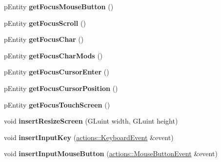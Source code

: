 \begin{DoxyCompactItemize}
\item 
\hypertarget{classfillwave_1_1Engine_aefde4bc713b408d61506022aeade536b}{}p\+Entity {\bfseries get\+Focus\+Mouse\+Button} ()\label{classfillwave_1_1Engine_aefde4bc713b408d61506022aeade536b}

\item 
\hypertarget{classfillwave_1_1Engine_a6f0ba798e60d2d07143ee193097d3a2a}{}p\+Entity {\bfseries get\+Focus\+Scroll} ()\label{classfillwave_1_1Engine_a6f0ba798e60d2d07143ee193097d3a2a}

\item 
\hypertarget{classfillwave_1_1Engine_a197ec75cd04d2f5f439151d050dcabfb}{}p\+Entity {\bfseries get\+Focus\+Char} ()\label{classfillwave_1_1Engine_a197ec75cd04d2f5f439151d050dcabfb}

\item 
\hypertarget{classfillwave_1_1Engine_ad3dc35ddb09c7244edca4b68a09a417e}{}p\+Entity {\bfseries get\+Focus\+Char\+Mods} ()\label{classfillwave_1_1Engine_ad3dc35ddb09c7244edca4b68a09a417e}

\item 
\hypertarget{classfillwave_1_1Engine_a3695c0daae1ac6728b59f3fd9ea8717b}{}p\+Entity {\bfseries get\+Focus\+Cursor\+Enter} ()\label{classfillwave_1_1Engine_a3695c0daae1ac6728b59f3fd9ea8717b}

\item 
\hypertarget{classfillwave_1_1Engine_a7e03137a6810f968be5884cf8af99090}{}p\+Entity {\bfseries get\+Focus\+Cursor\+Position} ()\label{classfillwave_1_1Engine_a7e03137a6810f968be5884cf8af99090}

\item 
\hypertarget{classfillwave_1_1Engine_aaffd805632dff9153fa76391987e902d}{}p\+Entity {\bfseries get\+Focus\+Touch\+Screen} ()\label{classfillwave_1_1Engine_aaffd805632dff9153fa76391987e902d}

\item 
\hypertarget{classfillwave_1_1Engine_ab5a508e59472b0653897b4c69ec09a63}{}void {\bfseries insert\+Resize\+Screen} (G\+Luint width, G\+Luint height)\label{classfillwave_1_1Engine_ab5a508e59472b0653897b4c69ec09a63}

\item 
\hypertarget{classfillwave_1_1Engine_aa5e13d284305180bf20d10305d8872b5}{}void {\bfseries insert\+Input\+Key} (\hyperlink{classfillwave_1_1actions_1_1KeyboardEvent}{actions\+::\+Keyboard\+Event} \&event)\label{classfillwave_1_1Engine_aa5e13d284305180bf20d10305d8872b5}

\item 
\hypertarget{classfillwave_1_1Engine_af5ffe1f7302ea8a702ca1b5bacbee3f0}{}void {\bfseries insert\+Input\+Mouse\+Button} (\hyperlink{classfillwave_1_1actions_1_1MouseButtonEvent}{actions\+::\+Mouse\+Button\+Event} \&event)\label{classfillwave_1_1Engine_af5ffe1f7302ea8a702ca1b5bacbee3f0}


\end{DoxyCompactItemize}
